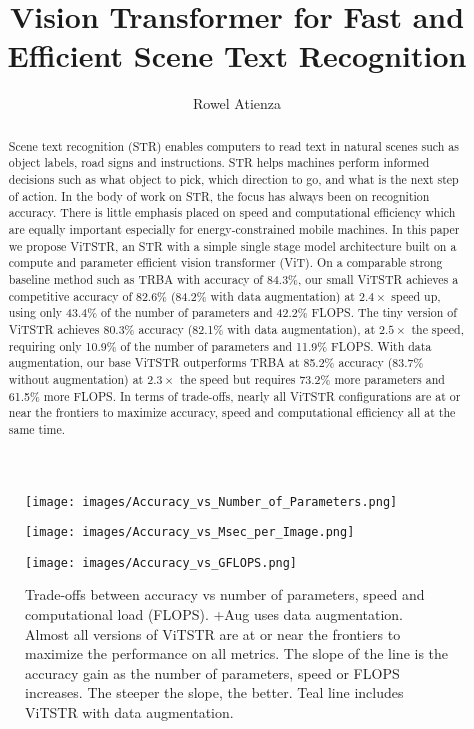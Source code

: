 \documentclass[runningheads]{llncs}
\begin{document}
\title{Vision Transformer for Fast and Efficient Scene Text Recognition}
\author{Rowel Atienza }  \maketitle              \begin{abstract}
Scene text recognition (STR) enables computers to read text in natural scenes such as object labels, road signs and instructions. STR helps machines perform informed decisions such as what object to pick, which direction to go, and what is the next step of action. In the body of work on STR, the focus has always been on recognition accuracy. There is little emphasis placed on speed and computational efficiency which are equally important especially for energy-constrained mobile machines. In this paper we propose ViTSTR, an STR with a simple single stage model architecture built on a compute and parameter efficient vision transformer (ViT). On a comparable strong baseline method such as TRBA with accuracy of 84.3\%, our small ViTSTR achieves a competitive accuracy of 82.6\% (84.2\% with data augmentation) at $2.4\times$ speed up, using only 43.4\% of the number of parameters and 42.2\% FLOPS. The tiny version of ViTSTR achieves 80.3\% accuracy (82.1\% with data augmentation), at $2.5\times$ the speed, requiring only 10.9\% of the number of parameters and 11.9\% FLOPS. With data augmentation, our base ViTSTR outperforms TRBA at 85.2\% accuracy (83.7\% without augmentation) at $2.3\times$ the speed but requires 73.2\% more parameters and 61.5\% more FLOPS.  In terms of trade-offs, nearly all ViTSTR configurations are at or near the frontiers to maximize accuracy, speed and computational efficiency all at the same time. 

\end{abstract}


\begin{figure}
\centering

    \texttt{[image: images/Accuracy\_vs\_Number\_of\_Parameters.png]}
        
    \texttt{[image: images/Accuracy\_vs\_Msec\_per\_Image.png]}
    
    \texttt{[image: images/Accuracy\_vs\_GFLOPS.png]}
 \caption{Trade-offs between accuracy vs number of parameters, speed and computational load (FLOPS). +Aug uses data augmentation. Almost all versions of ViTSTR are at or near the frontiers to maximize the performance on all metrics. The slope of the line is the accuracy gain as the number of parameters, speed or FLOPS increases. The steeper the slope, the better. Teal line includes ViTSTR with data augmentation.}
\label{fig:acc_vs_perf}
\end{figure}
\end{document}
